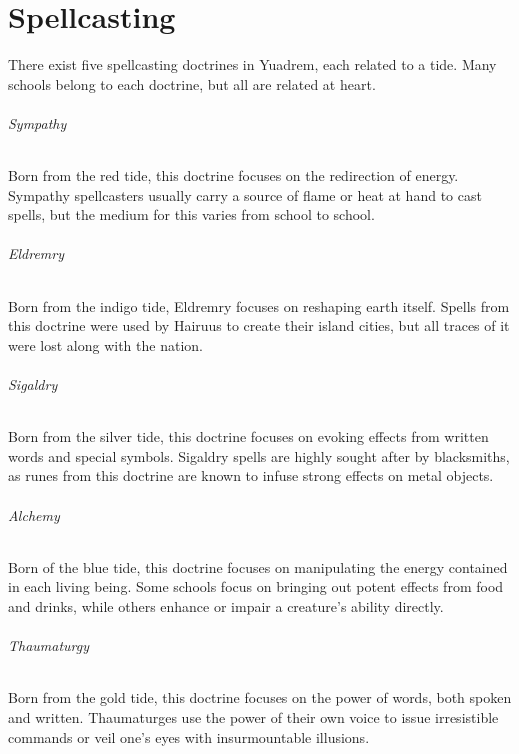\chapter{Spellcasting} \label{ch::spellcasting}
There exist five spellcasting doctrines in Yuadrem, each related to a tide.
Many schools belong to each doctrine, but all are related at heart.

\subparagraph{Sympathy} %
    Born from the red tide, this doctrine focuses on the redirection of energy.
    Sympathy spellcasters usually carry a source of flame or heat at hand to cast spells, but the medium for this varies from school to school.

\subparagraph{Eldremry} %
    Born from the indigo tide, Eldremry focuses on reshaping earth itself.
    Spells from this doctrine were used by Hairuus to create their island cities, but all traces of it were lost along with the nation.

\subparagraph{Sigaldry} %
    Born from the silver tide, this doctrine focuses on evoking effects from written words and special symbols.
    Sigaldry spells are highly sought after by blacksmiths, as runes from this doctrine are known to infuse strong effects on metal objects.

\subparagraph{Alchemy} %
    Born of the blue tide, this doctrine focuses on manipulating the energy contained in each living being.
    Some schools focus on bringing out potent effects from food and drinks, while others enhance or impair a creature's ability directly.

\subparagraph{Thaumaturgy} %
    Born from the gold tide, this doctrine focuses on the power of words, both spoken and written.
    Thaumaturges use the power of their own voice to issue irresistible commands or veil one's eyes with insurmountable illusions.


